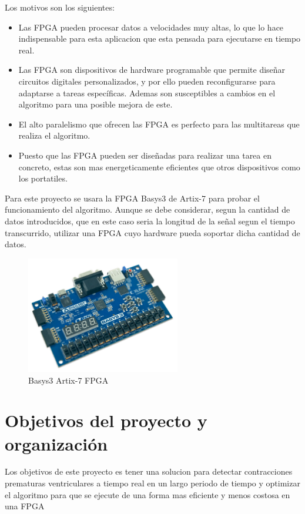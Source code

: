 Los motivos son los siguientes:

\begin{itemize}
	\item Las FPGA pueden procesar datos a velocidades muy altas, lo que lo hace indispensable para esta aplicacion
	 que esta pensada para ejecutarse en tiempo real.
	\item Las FPGA son dispositivos de hardware programable que permite diseñar circuitos digitales personalizados, 
	y por ello pueden reconfigurarse para adaptarse a tareas específicas. Ademas son susceptibles a cambios en el 
	algoritmo para una posible mejora de este.
	\item El alto paralelismo que ofrecen las FPGA es perfecto para las multitareas que realiza el algoritmo.
	\item Puesto que las FPGA pueden ser diseñadas para realizar una tarea en concreto, estas son mas energeticamente
	eficientes que otros dispositivos como los portatiles.
\end{itemize}

Para este proyecto se usara la FPGA Basys3 de Artix-7 para probar el funcionamiento del algoritmo. Aunque se debe considerar, segun
la cantidad de datos introducidos, que en este caso seria la longitud de la señal segun el tiempo transcurrido, utilizar
una FPGA cuyo hardware pueda soportar dicha cantidad de datos.
\begin{figure}[h]
	\centering
	\includegraphics[width=0.6\textwidth]{./Images/img_introduccion/Basys3.jpg}
	\caption{Basys3 Artix-7 FPGA}
	\label{fig:Basys3}
\end{figure}

\section{Objetivos del proyecto y organización}
Los objetivos de este proyecto es tener una solucion para detectar contracciones prematuras ventriculares a tiempo real en
un largo periodo de tiempo y optimizar el algoritmo para que se ejecute de una forma mas eficiente y menos costosa en una FPGA

